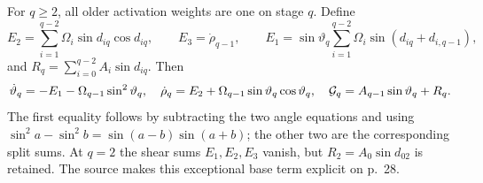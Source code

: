 For $q\ge2$, all older activation weights are one on stage $q$. Define
\[
 E_2=\sum_{i=1}^{q-2}\Omega_i\sin d_{iq}\cos d_{iq},\qquad E_3=\dot\rho_{q-1},\qquad
 E_1=\sin\vartheta_q\sum_{i=1}^{q-2}\Omega_i\sin(d_{iq}+d_{i,q-1}),
\]
and $R_q=\sum_{i=0}^{q-2}A_i\sin d_{iq}$. Then
\begin{equation}\label{pc:eq:older}
 \dot\vartheta_q=-E_1-\Omega_{q-1}\sin^2\vartheta_q,\quad
 \dot\rho_q=E_2+\Omega_{q-1}\sin\vartheta_q\cos\vartheta_q,\quad
 \mathcal G_q=A_{q-1}\sin\vartheta_q+R_q.
\end{equation}
The first equality follows by subtracting the two angle equations and using $\sin^2a-\sin^2b=\sin(a-b)\sin(a+b)$; the other two are the corresponding split sums. At $q=2$ the shear sums $E_1,E_2,E_3$ vanish, but $R_2=A_0\sin d_{02}$ is retained. The source makes this exceptional base term explicit on p.~28.

